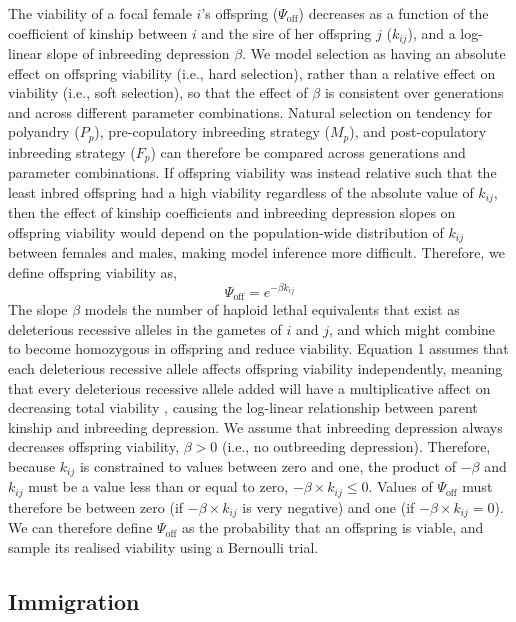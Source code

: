\documentclass[10pt,letterpaper]{article}
\begin{document}
The viability of a focal female $i$'s offspring ($\Psi_{\textrm{off}}$) decreases as a function of the coefficient of kinship between $i$ and the sire of her offspring $j$ ($k_{ij}$), and a log-linear slope of inbreeding depression $\beta$. We model selection as having an absolute effect on offspring viability (i.e., hard selection), rather than a relative effect on viability (i.e., soft selection), so that the effect of $\beta$ is consistent over generations and across different parameter combinations. Natural selection on tendency for polyandry ($P_{p}$), pre-copulatory inbreeding strategy ($M_{p}$), and post-copulatory inbreeding strategy ($F_{p}$) can therefore be compared across generations and parameter combinations. If offspring viability was instead relative such that the least inbred offspring had a high viability regardless of the absolute value of $k_{ij}$, then the effect of kinship coefficients and inbreeding depression slopes on offspring viability would depend on the population-wide distribution of $k_{ij}$ between females and males, making model inference more difficult. Therefore, we define offspring viability as,
\begin{equation}
\Psi_{\textrm{off}} = e^{-\beta k_{ij}}
\end{equation}
The slope $\beta$ models the number of haploid lethal equivalents that exist as deleterious recessive alleles in the gametes of $i$ and $j$, and which might combine to become homozygous in offspring and reduce viability. Equation 1 assumes that each deleterious recessive allele affects offspring viability independently, meaning that every deleterious recessive allele added will have a multiplicative affect on decreasing total viability \cite[][]{Morton1956, Mills1994}, causing the log-linear relationship between parent kinship and inbreeding depression. We assume that inbreeding depression always decreases offspring viability, $\beta > 0$ (i.e., no outbreeding depression). Therefore, because $k_{ij}$ is constrained to values between zero and one, the product of $-\beta$ and $k_{ij}$ must be a value less than or equal to zero, $-\beta \times k_{ij} \leq 0$. Values of $\Psi_{\textrm{off}}$ must therefore be between zero (if $-\beta \times k_{ij}$ is very negative) and one (if $-\beta \times k_{ij} = 0$). We can therefore define $\Psi_{\textrm{off}}$ as the probability that an offspring is viable, and sample its realised viability using a Bernoulli trial.

\subsection*{Immigration}
\end{document}
